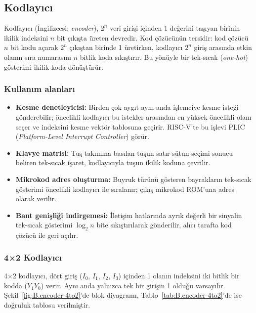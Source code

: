 \subsection{Kodlayıcı}

Kodlayıcı (İngilizcesi: \emph{encoder}), $2^n$ veri girişi içinden 1 değerini taşıyan birinin ikilik indeksini $n$ bit çıkışta üreten devredir. Kod çözücünün tersidir: kod çözücü $n$ bit kodu açarak $2^n$ çıkıştan birinde 1 üretirken, kodlayıcı $2^n$ giriş arasında etkin olanın sıra numarasını $n$ bitlik koda sıkıştırır. Bu yönüyle bir tek-sıcak (\emph{one-hot}) gösterimi ikilik koda dönüştürür.

\subsubsection{Kullanım alanları}
\begin{itemize}[nosep]
  \item \textbf{Kesme denetleyicisi:} Birden çok aygıt aynı anda işlemciye kesme isteği gönderebilir; öncelikli kodlayıcı bu istekler arasından en yüksek öncelikli olanı seçer ve indeksini kesme vektör tablosuna geçirir. RISC-V'te bu işlevi PLIC (\emph{Platform-Level Interrupt Controller}) görür.
  \item \textbf{Klavye matrisi:} Tuş takımına basılan tuşun satır-sütun seçimi sonucu beliren tek-sıcak işaret, kodlayıcıyla tuşun ikilik koduna çevrilir.
  \item \textbf{Mikrokod adres oluşturma:} Buyruk türünü gösteren bayrakların tek-sıcak gösterimi öncelikli kodlayıcı ile sıralanır; çıkış mikrokod ROM'una adres olarak verilir.
  \item \textbf{Bant genişliği indirgemesi:} İletişim hatlarında ayrık değerli bir sinyalin tek-sıcak gösterimi $\log_2 n$ bite sıkıştırılarak gönderilir, alıcı tarafta kod çözücü ile geri açılır.
\end{itemize}

\subsubsection{4×2 Kodlayıcı}
4×2 kodlayıcı, dört giriş ($I_0$, $I_1$, $I_2$, $I_3$) içinden 1 olanın indeksini iki bitlik bir kodda ($Y_1 Y_0$) verir. Aynı anda yalnızca tek bir girişin 1 olduğu varsayılır. Şekil~\ref{fig:B.encoder-4to2}'de blok diyagramı, Tablo~\ref{tab:B.encoder-4to2}'de ise doğruluk tablosu verilmiştir.

